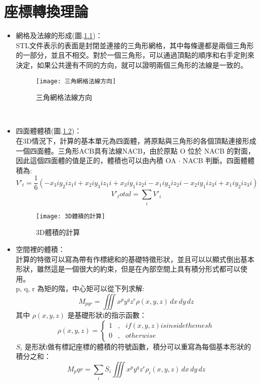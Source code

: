 \chapter{座標轉換理論}



\begin{itemize}
\item 網格及法線的形成(圖.\ref{三角網格法線方向})：\\
STL文件表示的表面是封閉並連接的三角形網格，其中每條邊都是兩個三角形的一部分，並且不相交。對於一個三角形，可以通過頂點的順序和右手定則來決定，如果公共邊有不同的方向，就可以證明兩個三角形的法線是一致的。\\
\begin{figure}[hbt!]
\begin{center}
\texttt{[image: 三角網格法線方向]}
\caption{\Large 三角網格法線方向}\label{三角網格法線方向}
\end{center}
\end{figure}
\\
\item 四面體體積(圖.\ref{3D體積的計算})：\\
在3D情況下，計算的基本單元為四面體，將原點與三角形的各個頂點連接形成一個四面體。三角形ACB具有法線NACB，由於原點 O 位於 NACB 的對面，因此這個四面體的值是正的，體積也可以由內積 OA $\cdot$ NACB 判斷。四面體體積為:\\
$$ V'_t = \frac{1}{6}(-x_3i y_2i z_1i + x_2i y_3i z_1i + x_3i y_1i z_2i - x_1i y_3i z_2i - x_2i y_1i z_3i + x_1i y_2i z_3i) $$
$$ V'_total= \sum_{i}V'_i$$

\begin{figure}[hbt!]
\begin{center}
\texttt{[image: 3D體積的計算]}
\caption{\Large 3D體積的計算}\label{3D體積的計算}
\end{center}
\end{figure}
\item 空間裡的體積：\\
計算的特徵可以寫為帶有作標總和的基礎特徵形狀，並且可以以顯式倒出基本形狀，雖然這是一個很大的約束，但是在內部空間上具有積分形式都可以使用。\\
 p, q, r 為矩的階，中心矩可以從下列求解:\\

$$M_{pqr} = \iiint x^{p} y^{q} z^{r} \rho (x,y,z) \,dx\,dy\,dz$$
其中 $\rho (x,y,z)$ 是基礎形狀i的指示函數：\\
\begin{equation}
\label{eq6}
\rho (x,y,z) = \left\{
\begin{aligned}
1 & , & if (x,y,z) is inside the mesh\\
0 & , &              otherwise
\end{aligned}
\right.
\end{equation}
$S_i$ 是形狀i做有標記座標的體積的符號函數，積分可以重寫為每個基本形狀的積分之和：\\
$$M_pqr = \sum_{i} S_i \iiint x^{p} y^{q} z^{r} \rho_i (x,y,z) \,dx\,dy\,dz$$


\end{itemize}
